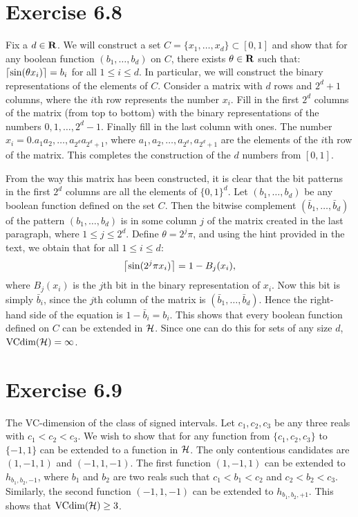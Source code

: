   
\section*{Exercise 6.8}

Fix a $d \in \mathbf{R}$. We will construct a set $C = \{x_1, 
\ldots, x_d\} \subset [0, 1]$ and show that for any boolean function $(b_1, \ldots, b_d)$ 
on $C$, there exists $\theta \in \mathbf{R}$ such that: $\left \lceil \sin (\theta x_i)  \right \rceil = b_i$ 
for all $1 \leq i \leq d$. In particular, we will construct the binary representations
of the elements of $C$. Consider a matrix with $d$ rows and $2^d + 1$ columns, where 
the $i$th row represents the number $x_i$. Fill in the first $2^d$ columns of the matrix
(from top to bottom) with the binary representations of the numbers $0, 1, \ldots, 2^d - 1$.
Finally fill in the last column with ones. The number $x_i = 0.a_1a_2, \ldots, 
a_{2^d}a_{2^d + 1}$, where $a_1, a_2, \ldots, a_{2^d}, a_{2^d + 1}$ are the elements
of the $i$th row of the matrix. This completes the construction of the $d$ numbers from 
$[0, 1]$.

From the way this matrix has been constructed, it is clear that the bit patterns in the 
first $2^d$ columns are all the elements of $\{0, 1\}^d$. Let $(b_1, \ldots, b_d)$ be any 
boolean function defined on the set $C$. Then the bitwise complement $(\bar{b}_1, \ldots, 
\bar{b}_d)$ of the pattern $(b_1, \ldots, b_d)$ is in some column $j$ of the matrix 
created in the last paragraph, where $1 \leq j \leq 2^d$. Define $\theta = 2^j \pi$, and
using the hint provided in the text, we obtain that  for all $1 \leq i \leq d$:
\[
    \left \lceil \sin(2^j \pi x_i) \right \rceil = 1 - B_j(x_i),  
\]  
where $B_j(x_i)$ is the $j$th bit in the binary representation of $x_i$. Now this bit is 
simply $\bar{b}_i$, since the $j$th column of the matrix is $(\bar{b}_1, \ldots, 
\bar{b}_d)$. Hence the right-hand side of the equation is $1 - \bar{b}_i = b_i$. 
This shows that every boolean function defined on $C$ can be extended in $\mathcal{H}$. Since
one can do this for sets of any size $d$, $\text{VCdim} (\mathcal{H}) = \infty$. 
 

\section*{Exercise 6.9}

The VC-dimension of the class of signed intervals. Let $c_1, c_2, c_3$ be any
three reals with $c_1 < c_2 < c_3$. We wish to show that for any function from
$\{c_1, c_2, c_3\}$ to $\{-1, 1\}$ can be extended to a function in
$\mathcal{H}$.  The only contentious candidates are $(1, -1, 1)$ and $(-1, 1,
-1)$. The first function $(1, -1, 1)$ can be extended to $h_{b_1, b_2, -1}$,
where $b_1$ and $b_2$ are two reals such that $c_1 < b_1 < c_2$ and $c_2 < b_2
< c_3$. Similarly, the second function $(-1, 1, -1)$ can be extended to
$h_{b_1, b_2, +1}$. This shows that $\text{VCdim} (\mathcal{H}) \geq 3$. 

